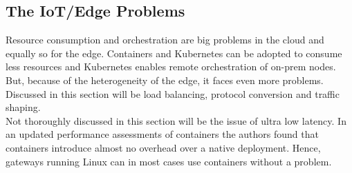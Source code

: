\subsection{The IoT/Edge Problems}
Resource consumption and orchestration are big problems in the cloud and equally so for the edge. Containers and Kubernetes can be adopted to consume less resources and Kubernetes enables remote orchestration of on-prem nodes. But, because of the heterogeneity of the edge, it faces even more problems. Discussed in this section will be load balancing, protocol conversion and traffic shaping.\\ Not thoroughly discussed in this section will be the issue of ultra low latency. In an updated performance assessments of containers the authors found that containers introduce almost no overhead over a native deployment\cite{felter2015updatedPerformanceContainers}. Hence, gateways running Linux can in most cases use containers without a problem. 








